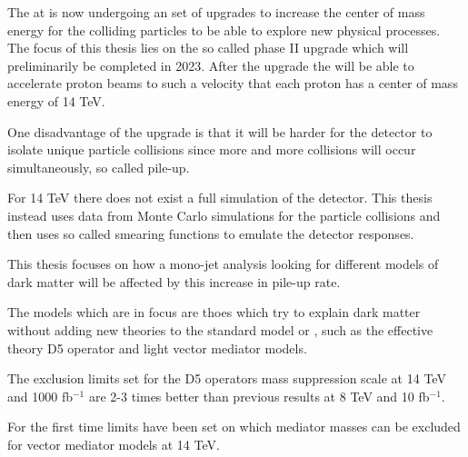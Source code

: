 The \abbrLHC at \abbrCERN is now undergoing an set of upgrades to increase the center of mass energy for the colliding particles to be able to explore new physical processes. The focus of this thesis lies on the so called phase II upgrade which will preliminarily be completed in 2023. After the upgrade the \abbrLHC will be able to accelerate proton beams to such a velocity that each proton has a center of mass energy of 14 TeV.

One disadvantage of the upgrade is that it will be harder for the \abbrATLAS detector to isolate unique particle collisions since more and more collisions will occur simultaneously, so called pile-up. 

For 14 TeV there does not exist a full simulation of the \abbrATLAS detector. This thesis instead uses data from Monte Carlo simulations for the particle collisions and then uses so called smearing functions to emulate the detector responses. 

This thesis focuses on how a mono-jet analysis looking for different \abbrWIMP models of dark matter will be affected by this increase in pile-up rate.

The models which are in focus are thoes which try to explain dark matter without adding new theories to the standard model or \abbrQFT , such as the effective theory D5 operator and light vector mediator models.

The exclusion limits set for the D5 operators mass suppression scale at 14 TeV and 1000 fb$^{-1}$ are 2-3 times better than previous results at 8 TeV and 10 fb$^{-1}$. 

For the first time limits have been set on which mediator masses can be excluded for vector mediator models at 14 TeV.